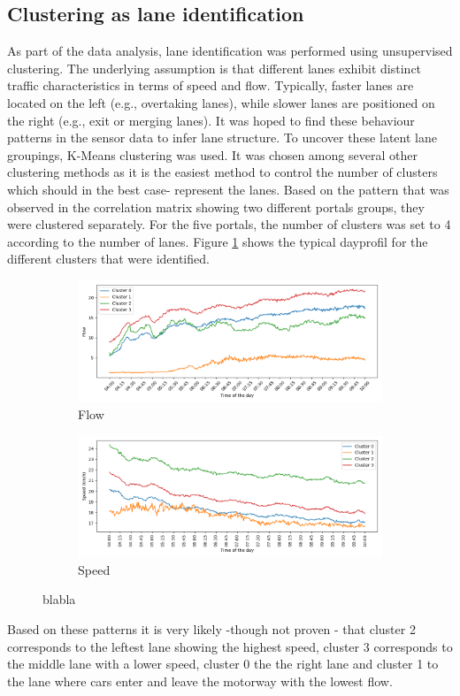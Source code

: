 	\subsection{Clustering as lane identification}
	As part of the data analysis, lane identification was performed using unsupervised clustering.
	The underlying assumption is that different lanes exhibit distinct traffic characteristics in terms of speed and flow. Typically, faster lanes are located on the left (e.g., overtaking lanes), while slower lanes are positioned on the right (e.g., exit or merging lanes). It was hoped to find these behaviour patterns in the sensor data to infer lane structure.
	To uncover these latent lane groupings, K-Means clustering was used. It was chosen among several other clustering methods as it is the easiest method to control the number of clusters which should in the best case- represent the lanes.
	Based on the pattern that was observed in the correlation matrix showing two different portals groups, they were clustered separately. 
	For the five portals, the number of clusters was set to 4 according to the number of lanes.
	Figure \ref{fig:clustering_5portals} shows the typical dayprofil for the different clusters that were identified.
	\begin{figure}[H]
		\centering
		\begin{subfigure}{0.9 \linewidth}
			\includegraphics[width=\textwidth]{../Plots/Flow/clustering_5portals}
			\caption{Flow}
		\end{subfigure}
		\begin{subfigure}{0.9 \linewidth}
			\includegraphics[width=\textwidth]{../Plots/Speed/clustering_5portals}
			\caption{Speed}
		\end{subfigure}
		\caption{blabla}
		\label{fig:clustering_5portals}
	\end{figure}
	Based on these patterns it is very likely -though not proven - that cluster 2 corresponds to the leftest lane showing the highest speed, cluster 3 corresponds to the middle lane with a lower speed, cluster 0 the the right lane and cluster 1 to the lane where cars enter and leave the motorway with the lowest flow.
	
